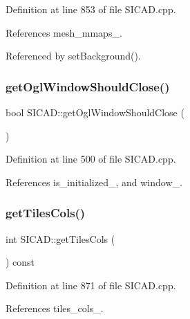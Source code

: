 Definition at line 853 of file S\+I\+C\+A\+D.\+cpp.



References mesh\+\_\+mmaps\+\_\+.



Referenced by set\+Background().

\mbox{\label{classSICAD_aaf003ab2ac8bc5ebdef6611ca1547e73}} 
\subsubsection{\texorpdfstring{get\+Ogl\+Window\+Should\+Close()}{getOglWindowShouldClose()}}
{\footnotesize\ttfamily bool S\+I\+C\+A\+D\+::get\+Ogl\+Window\+Should\+Close (\begin{DoxyParamCaption}{ }\end{DoxyParamCaption})}



Definition at line 500 of file S\+I\+C\+A\+D.\+cpp.



References is\+\_\+initialized\+\_\+, and window\+\_\+.

\mbox{\label{classSICAD_a2ba3a0aeb3dab9996bdeed19a16eae56}} 
\subsubsection{\texorpdfstring{get\+Tiles\+Cols()}{getTilesCols()}}
{\footnotesize\ttfamily int S\+I\+C\+A\+D\+::get\+Tiles\+Cols (\begin{DoxyParamCaption}{ }\end{DoxyParamCaption}) const}



Definition at line 871 of file S\+I\+C\+A\+D.\+cpp.



References tiles\+\_\+cols\+\_\+.

\mbox{\label{classSICAD_a728f82ebbfeea54f3fef2fc0c56a4964}} 
